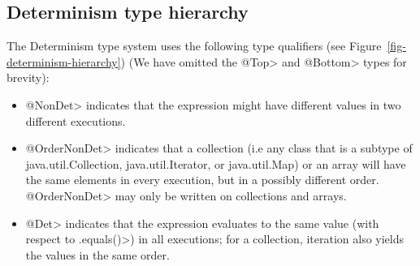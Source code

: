 % 
% 
% 
% 
% 


\subsection{Determinism type hierarchy}
The Determinism type system uses the following type qualifiers (see Figure~\ref{fig-determinism-hierarchy}) (We have omitted the
\<@Top> and \<@Bottom> types for brevity):
\begin{itemize}
    \item \<@NonDet> indicates
    that the expression might have different values in two different executions.
    \item \<@OrderNonDet> indicates that
    a collection (i.e any class that is a subtype of java.util.Collection, java.util.Iterator, or java.util.Map) or an array will have the same elements in every execution, but in a
    possibly different order.  \<@OrderNonDet> may only be written on
    collections and arrays.
    \item \<@Det> indicates that
    the expression evaluates to the same value (with respect to \<.equals()>) in all
    executions; for a collection, iteration also yields the values in the same
    order.
\end{itemize}

